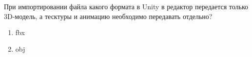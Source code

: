 
При импортировании файла какого формата в Unity в редактор передается только 3D-модель, а тесктуры и анимацию необходимо передавать отдельно?

\begin{enumerate}
    \item fbx
    \item obj
\end{enumerate}